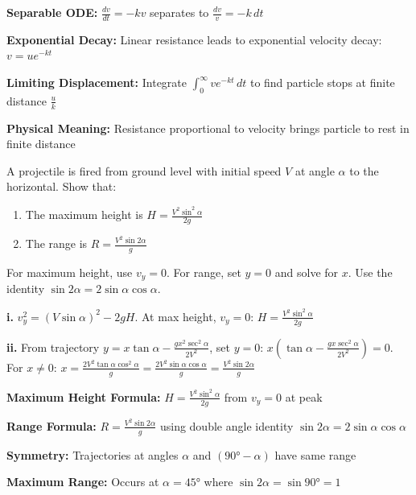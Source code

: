 \begin{takeaways}
\item \textbf{Separable ODE:} $\frac{dv}{dt} = -kv$ separates to $\frac{dv}{v} = -k\,dt$
\item \textbf{Exponential Decay:} Linear resistance leads to exponential velocity decay: $v = ue^{-kt}$
\item \textbf{Limiting Displacement:} Integrate $\int_0^\infty ve^{-kt}\,dt$ to find particle stops at finite distance $\frac{u}{k}$
\item \textbf{Physical Meaning:} Resistance proportional to velocity brings particle to rest in finite distance
\end{takeaways}

\begin{problem}
A projectile is fired from ground level with initial speed $V$ at angle $\alpha$ to the horizontal. Show that:
\begin{enumerate}[label=\textbf{\roman*.}]
    \item The maximum height is $H = \frac{V^2\sin^2\alpha}{2g}$
    \item The range is $R = \frac{V^2\sin 2\alpha}{g}$
\end{enumerate}
\end{problem}

\begin{hint}
For maximum height, use $v_y = 0$. For range, set $y = 0$ and solve for $x$. Use the identity $\sin 2\alpha = 2\sin\alpha\cos\alpha$.
\end{hint}

\begin{solution}
\textbf{i.} $v_y^2 = (V\sin\alpha)^2 - 2gH$. At max height, $v_y = 0$: $H = \frac{V^2\sin^2\alpha}{2g}$

\textbf{ii.} From trajectory $y = x\tan\alpha - \frac{gx^2\sec^2\alpha}{2V^2}$, set $y=0$: $x\left(\tan\alpha - \frac{gx\sec^2\alpha}{2V^2}\right) = 0$. For $x \neq 0$: $x = \frac{2V^2\tan\alpha\cos^2\alpha}{g} = \frac{2V^2\sin\alpha\cos\alpha}{g} = \frac{V^2\sin 2\alpha}{g}$
\end{solution}

\begin{takeaways}
\item \textbf{Maximum Height Formula:} $H = \frac{V^2\sin^2\alpha}{2g}$ from $v_y = 0$ at peak
\item \textbf{Range Formula:} $R = \frac{V^2\sin 2\alpha}{g}$ using double angle identity $\sin 2\alpha = 2\sin\alpha\cos\alpha$
\item \textbf{Symmetry:} Trajectories at angles $\alpha$ and $(90° - \alpha)$ have same range
\item \textbf{Maximum Range:} Occurs at $\alpha = 45°$ where $\sin 2\alpha = \sin 90° = 1$
\end{takeaways}

